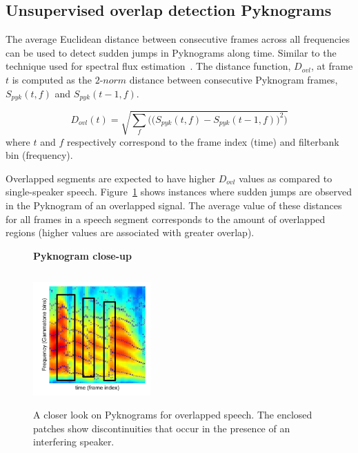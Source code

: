 {\subsection{Unsupervised overlap detection Pyknograms}

The average Euclidean distance between consecutive frames across all frequencies can be used to detect sudden jumps in Pyknograms along time. 
Similar to the technique used for spectral flux estimation~\cite{Rossignol_spectralflux}. 
The distance function, $D_{ovl}$, at frame $t$ is computed as the $2$-$norm$ distance between consecutive Pyknogram frames, $S_{pyk}(t,f)$ and $S_{pyk}(t-1,f)$. 

\begin{equation}
\label{eq:ovl_det_score}
D_{ovl}(t) = \sqrt{\sum_f\Big(\big(S_{pyk}(t,f)-S_{pyk}(t-1,f)\big)^2\Big)}
\end{equation}
where $t$ and $f$ respectively correspond to the frame index (time) and filterbank bin (frequency). 

Overlapped segments are expected to have higher $D_{ovl}$ values as compared to single-speaker speech. 
Figure~\ref{fig:pyknograms_for_overlaps} shows instances where sudden jumps are observed in the Pyknogram of an overlapped signal. 
The average value of these distances for all frames in a speech segment corresponds to the amount of overlapped regions (higher values are associated with greater overlap). 

\begin{figure}[h!]
\centering
\vspace{1mm}
    \textbf{Pyknogram close-up}\par\medskip
\vspace{-1mm}
\includegraphics[height =2.0in, width=0.4\textwidth]{figures/co-channel_pyknogram-crop}
\vspace{-1mm}
\caption{A closer look on Pyknograms for overlapped speech. The enclosed patches show discontinuities that occur in the presence of an interfering speaker.}
\vspace{-1mm}
\label{fig:pyknograms_for_overlaps}
\end{figure}


}
